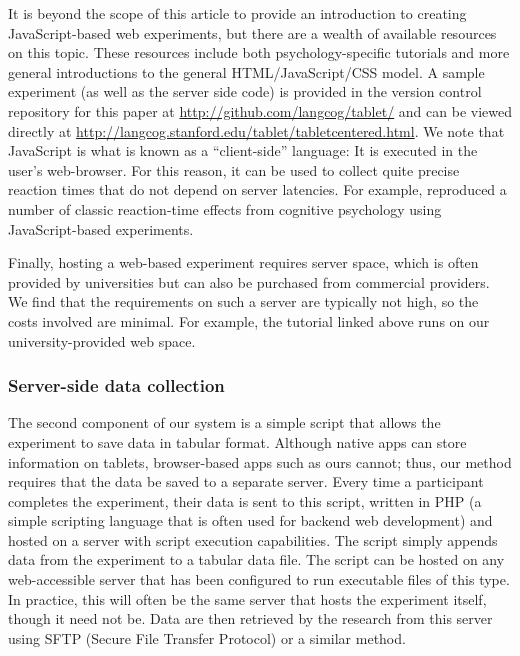 \documentclass[man,noapacite]{apa2}
\begin{document}
It is beyond the scope of this article to provide an introduction to creating JavaScript-based web experiments, but there are a wealth of available resources on this topic. These resources include both psychology-specific tutorials and more general introductions to the general HTML/JavaScript/CSS model. A sample experiment (as well as the server side code) is provided in the version control repository for this paper  at \url{http://github.com/langcog/tablet/} and can be viewed directly at \url{http://langcog.stanford.edu/tablet/tabletcentered.html}. We note that JavaScript is what is known as a ``client-side'' language: It is executed in the user's web-browser. For this reason, it can be used to collect quite precise reaction times that do not depend on server latencies. For example,  reproduced a number of classic reaction-time effects from cognitive psychology using JavaScript-based experiments. 

Finally, hosting a web-based experiment requires server space, which is often provided by universities but can also be purchased from commercial providers. We find that the requirements on such a server are typically not high, so the costs involved are minimal. For example, the tutorial linked above runs on our university-provided web space.


\subsubsection{Server-side data collection}

The second component of our system is a simple script that allows the experiment to save data in tabular format. Although native apps can store information on tablets, browser-based apps such as ours cannot; thus, our method requires that the data be saved to a separate server. Every time a participant completes the experiment, their data is sent to this script, written in PHP (a simple scripting language that is often used for backend web development) and hosted on a server with script execution capabilities. The script simply appends data from the experiment to a tabular data file. The script can be hosted on any web-accessible server that has been configured to run executable files of this type. In practice, this will often be the same server that hosts the experiment itself, though it need not be. Data are then retrieved by the research from this server using SFTP (Secure File Transfer Protocol) or a similar method. 
\end{document}
